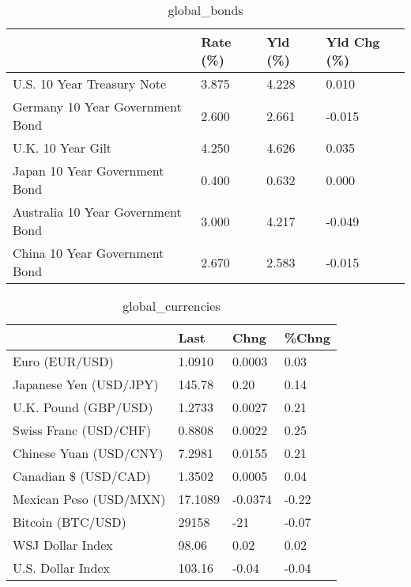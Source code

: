 \documentclass{article}%
\begin{document}
%


\begin{table}[htbp]%
\caption{global\_bonds}%
\centering%
\begin{adjustbox}{width=1\textwidth}%
\begin{tabular}{llll}
\toprule
                                  & Rate (\%) & Yld (\%) & Yld Chg (\%) \\
\midrule
       U.S. 10 Year Treasury Note &    3.875 &   4.228 &       0.010 \\
  Germany 10 Year Government Bond &    2.600 &   2.661 &      -0.015 \\
                U.K. 10 Year Gilt &    4.250 &   4.626 &       0.035 \\
    Japan 10 Year Government Bond &    0.400 &   0.632 &       0.000 \\
Australia 10 Year Government Bond &    3.000 &   4.217 &      -0.049 \\
    China 10 Year Government Bond &    2.670 &   2.583 &      -0.015 \\
\bottomrule
\end{tabular}
%
\end{adjustbox}%
\end{table}

%


\begin{table}[htbp]%
\caption{global\_currencies}%
\centering%
\begin{adjustbox}{width=1\textwidth}%
\begin{tabular}{llll}
\toprule
                       &    Last &    Chng & \%Chng \\
\midrule
        Euro (EUR/USD) &  1.0910 &  0.0003 &  0.03 \\
Japanese Yen (USD/JPY) &  145.78 &    0.20 &  0.14 \\
  U.K. Pound (GBP/USD) &  1.2733 &  0.0027 &  0.21 \\
 Swiss Franc (USD/CHF) &  0.8808 &  0.0022 &  0.25 \\
Chinese Yuan (USD/CNY) &  7.2981 &  0.0155 &  0.21 \\
  Canadian \$ (USD/CAD) &  1.3502 &  0.0005 &  0.04 \\
Mexican Peso (USD/MXN) & 17.1089 & -0.0374 & -0.22 \\
     Bitcoin (BTC/USD) &   29158 &     -21 & -0.07 \\
      WSJ Dollar Index &   98.06 &    0.02 &  0.02 \\
     U.S. Dollar Index &  103.16 &   -0.04 & -0.04 \\
\bottomrule
\end{tabular}
%
\end{adjustbox}%
\end{table}
\end{document}

